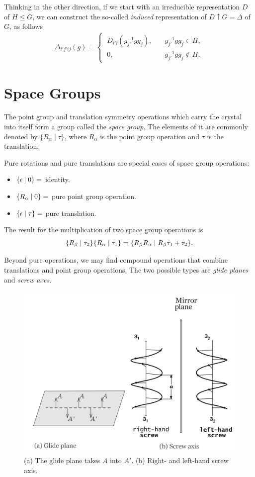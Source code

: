Thinking in the other direction, if we start with an irreducible representation $D$ of $H \leq G$, we can construct the so-called \textit{induced} representation of $D \uparrow G = \Delta$ of $G$, as follows
\begin{align*}
\Delta_{i'j'ij}(g) =
\begin{cases}
\; D_{i'i}(g_{j'}^{-1} g g_j), \quad & g_{j'}^{-1} g g_j \in H, \\
\; 0,  & g_{j'}^{-1} g g_j \notin H.
\end{cases}
\end{align*}

\section{Space Groups}

The point group and translation symmetry operations which carry the crystal into itself form a group called the \textit{space group}. The elements of it are commonly denoted by  $\{ R_\alpha \mid \tau \} $, where $R_\alpha$ is the point group operation and $\tau$ is the translation.

Pure rotations and pure translations are special cases of space group operations:
\begin{itemize}
\item $\{ \epsilon \mid 0 \} =$ identity.
\item $\{ R_\alpha \mid 0 \} =$ pure point group operation.
\item $\{ \epsilon \mid \tau \} =$ pure translation.
\end{itemize}

The result for the multiplication of two space group operations is
$$
\{ R_\beta \mid \tau_2 \} \{ R_\alpha \mid \tau_1 \} = \{ R_\beta R_\alpha \mid R_\beta\tau_1 + \tau_2 \}.
$$

Beyond pure operations, we may find compound operations that combine translations and point group operations. The two possible types are \textit{glide planes} and \textit{screw axes}.
\begin{figure}[H]
\centering
\includegraphics[width=0.5\linewidth]{fig/glideplane-screwaxis.png}
\caption{(a) The glide plane takes $A$ into $A'$. (b) Right- and left-hand screw axis.}
\label{fig:glideplane-screwaxis}
\end{figure}

